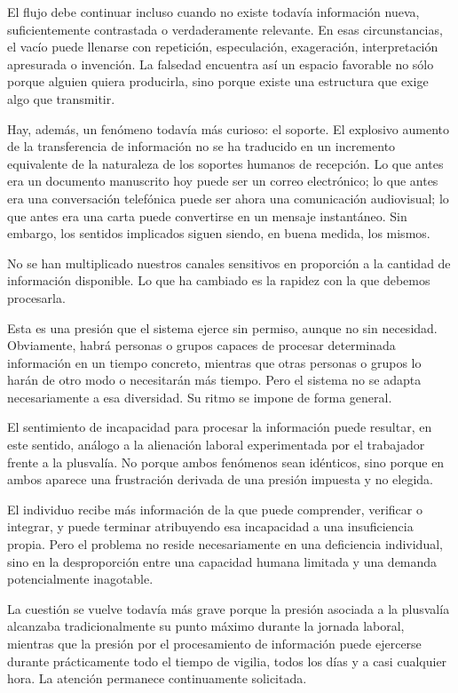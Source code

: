 \documentclass[11pt,a4paper]{article}
\begin{document}
El flujo debe continuar incluso cuando no existe todavía información nueva, suficientemente contrastada o verdaderamente relevante. En esas circunstancias, el vacío puede llenarse con repetición, especulación, exageración, interpretación apresurada o invención. La falsedad encuentra así un espacio favorable no sólo porque alguien quiera producirla, sino porque existe una estructura que exige algo que transmitir.

Hay, además, un fenómeno todavía más curioso: el soporte. El explosivo aumento de la transferencia de información no se ha traducido en un incremento equivalente de la naturaleza de los soportes humanos de recepción. Lo que antes era un documento manuscrito hoy puede ser un correo electrónico; lo que antes era una conversación telefónica puede ser ahora una comunicación audiovisual; lo que antes era una carta puede convertirse en un mensaje instantáneo. Sin embargo, los sentidos implicados siguen siendo, en buena medida, los mismos.

No se han multiplicado nuestros canales sensitivos en proporción a la cantidad de información disponible. Lo que ha cambiado es la rapidez con la que debemos procesarla.

Esta es una presión que el sistema ejerce sin permiso, aunque no sin necesidad. Obviamente, habrá personas o grupos capaces de procesar determinada información en un tiempo concreto, mientras que otras personas o grupos lo harán de otro modo o necesitarán más tiempo. Pero el sistema no se adapta necesariamente a esa diversidad. Su ritmo se impone de forma general.

El sentimiento de incapacidad para procesar la información puede resultar, en este sentido, análogo a la alienación laboral experimentada por el trabajador frente a la plusvalía. No porque ambos fenómenos sean idénticos, sino porque en ambos aparece una frustración derivada de una presión impuesta y no elegida.

El individuo recibe más información de la que puede comprender, verificar o integrar, y puede terminar atribuyendo esa incapacidad a una insuficiencia propia. Pero el problema no reside necesariamente en una deficiencia individual, sino en la desproporción entre una capacidad humana limitada y una demanda potencialmente inagotable.

La cuestión se vuelve todavía más grave porque la presión asociada a la plusvalía alcanzaba tradicionalmente su punto máximo durante la jornada laboral, mientras que la presión por el procesamiento de información puede ejercerse durante prácticamente todo el tiempo de vigilia, todos los días y a casi cualquier hora. La atención permanece continuamente solicitada.
\end{document}

